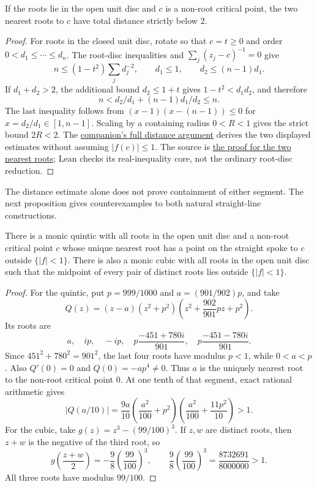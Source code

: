 \documentclass[11pt]{article}
\begin{document}
\begin{corollary}
If the roots lie in the open unit disc and $c$ is a non-root critical point,
the two nearest roots to $c$ have total distance strictly below $2$.
\end{corollary}
\begin{proof}
For roots in the closed unit disc, rotate so that $c=t\ge0$ and order
$0<d_1\le\cdots\le d_n$. The root-disc inequalities and
$\sum_j(z_j-c)^{-1}=0$ give
\[
 n\le(1-t^2)\sum_jd_j^{-2},\qquad
 d_1\le1,\qquad d_2\le(n-1)d_1.
\]
If $d_1+d_2>2$, the additional bound $d_2\le1+t$ gives
$1-t^2<d_1d_2$, and therefore
\[
 n<d_2/d_1+(n-1)d_1/d_2\le n.
\]
The last inequality follows from
$(x-1)(x-(n-1))\le0$ for $x=d_2/d_1\in[1,n-1]$.
Scaling by a containing radius $0<R<1$ gives the strict bound $2R<2$.
The \href{erdos1041-lemniscate-reasoning-surface.pdf\#two-nearest-root-distance}{companion's full distance argument}
derives the two displayed estimates without assuming $|f(c)|\le1$.
The source is
\href{https://github.com/wcook04/plectis-erdos/blob/a729f05c40398663fd586c9da487ad874d898639/research_corpus/Erdos1041/GlobalCriticalTwoNearestBudget.md}{the proof for the two nearest roots}; Lean checks its real-inequality core,
not the ordinary root-disc reduction.
\end{proof}

The distance estimate alone does not prove containment of either segment.
The next proposition gives counterexamples to both natural straight-line
constructions.

\begin{proposition}
\label{res:straight-no-go}
There is a monic quintic with all roots in the open unit disc and a non-root
critical point $c$ whose unique nearest root has a point on the straight spoke
to $c$ outside $\{|f|<1\}$.  There is also a monic cubic with all roots in the
open unit disc such that the midpoint of every pair of distinct roots lies
outside $\{|f|<1\}$.
\end{proposition}

\begin{proof}
For the quintic, put $p=999/1000$ and $a=(901/902)p$, and take
\[
 Q(z)=(z-a)(z^2+p^2)
       \left(z^2+\frac{902}{901}pz+p^2\right).
\]
Its roots are
\[
 a,\quad ip,\quad-ip,\quad
 p\frac{-451+780i}{901},\quad p\frac{-451-780i}{901}.
\]
Since $451^2+780^2=901^2$, the last four roots have modulus $p<1$,
while $0<a<p$. Also $Q'(0)=0$ and $Q(0)=-ap^4\ne0$. Thus $a$ is
the uniquely nearest root to the non-root critical point $0$.
At one tenth of that segment, exact rational arithmetic gives
\[
 |Q(a/10)|=
 \frac{9a}{10}\left(\frac{a^2}{100}+p^2\right)
 \left(\frac{a^2}{100}+\frac{11p^2}{10}\right)>1.
\]
For the cubic, take $g(z)=z^3-(99/100)^3$. If $z,w$ are distinct roots,
then $z+w$ is the negative of the third root, so
\[
 g\!\left(\frac{z+w}{2}\right)
 =-\frac98\left(\frac{99}{100}\right)^3,
 \qquad \frac98\left(\frac{99}{100}\right)^3
 =\frac{8732691}{8000000}>1.
\]
All three roots have modulus $99/100$.
\end{proof}
\end{document}
